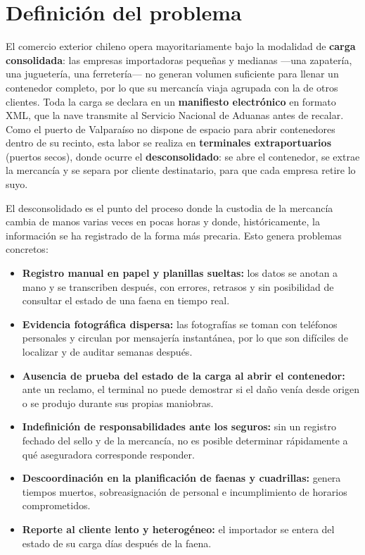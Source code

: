\chapter{Definición del problema}
\label{cap:problema}

El comercio exterior chileno opera mayoritariamente bajo la modalidad de \textbf{carga
consolidada}: las empresas importadoras pequeñas y medianas ---una zapatería, una juguetería, una
ferretería--- no generan volumen suficiente para llenar un contenedor completo, por lo que su
mercancía viaja agrupada con la de otros clientes. Toda la carga se declara en un
\textbf{manifiesto electrónico} en formato XML, que la nave transmite al Servicio Nacional de
Aduanas antes de recalar. Como el puerto de Valparaíso no dispone de espacio para abrir
contenedores dentro de su recinto, esta labor se realiza en \textbf{terminales extraportuarios}
(puertos secos), donde ocurre el \textbf{desconsolidado}: se abre el contenedor, se extrae la
mercancía y se separa por cliente destinatario, para que cada empresa retire lo suyo.

El desconsolidado es el punto del proceso donde la custodia de la mercancía cambia de manos varias
veces en pocas horas y donde, históricamente, la información se ha registrado de la forma más
precaria. Esto genera problemas concretos:

\begin{itemize}
    \item \textbf{Registro manual en papel y planillas sueltas:} los datos se anotan a mano y se
          transcriben después, con errores, retrasos y sin posibilidad de consultar el estado de
          una faena en tiempo real.
    \item \textbf{Evidencia fotográfica dispersa:} las fotografías se toman con teléfonos
          personales y circulan por mensajería instantánea, por lo que son difíciles de localizar
          y de auditar semanas después.
    \item \textbf{Ausencia de prueba del estado de la carga al abrir el contenedor:} ante un
          reclamo, el terminal no puede demostrar si el daño venía desde origen o se produjo
          durante sus propias maniobras.
    \item \textbf{Indefinición de responsabilidades ante los seguros:} sin un registro fechado del
          sello y de la mercancía, no es posible determinar rápidamente a qué aseguradora
          corresponde responder.
    \item \textbf{Descoordinación en la planificación de faenas y cuadrillas:} genera tiempos
          muertos, sobreasignación de personal e incumplimiento de horarios comprometidos.
    \item \textbf{Reporte al cliente lento y heterogéneo:} el importador se entera del estado de su
          carga días después de la faena.
\end{itemize}

